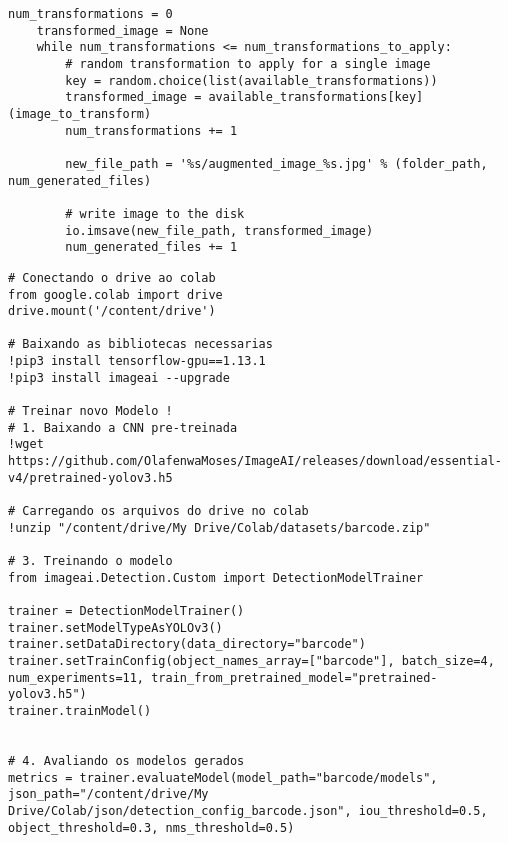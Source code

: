 \begin{lstlisting}[caption=Método de \textit{Data augmentation}]
    num_transformations = 0
    transformed_image = None
    while num_transformations <= num_transformations_to_apply:
        # random transformation to apply for a single image
        key = random.choice(list(available_transformations))
        transformed_image = available_transformations[key](image_to_transform)
        num_transformations += 1

        new_file_path = '%s/augmented_image_%s.jpg' % (folder_path, num_generated_files)

        # write image to the disk
        io.imsave(new_file_path, transformed_image)
        num_generated_files += 1
\end{lstlisting}

\newpage

\begin{lstlisting}[caption=Treinamento do modelo de \textit{barcodes}]
# Conectando o drive ao colab
from google.colab import drive
drive.mount('/content/drive')
        
# Baixando as bibliotecas necessarias
!pip3 install tensorflow-gpu==1.13.1
!pip3 install imageai --upgrade

# Treinar novo Modelo !
# 1. Baixando a CNN pre-treinada
!wget https://github.com/OlafenwaMoses/ImageAI/releases/download/essential-v4/pretrained-yolov3.h5

# Carregando os arquivos do drive no colab
!unzip "/content/drive/My Drive/Colab/datasets/barcode.zip"

# 3. Treinando o modelo
from imageai.Detection.Custom import DetectionModelTrainer

trainer = DetectionModelTrainer()
trainer.setModelTypeAsYOLOv3()
trainer.setDataDirectory(data_directory="barcode")
trainer.setTrainConfig(object_names_array=["barcode"], batch_size=4, num_experiments=11, train_from_pretrained_model="pretrained-yolov3.h5")
trainer.trainModel()


# 4. Avaliando os modelos gerados
metrics = trainer.evaluateModel(model_path="barcode/models", json_path="/content/drive/My Drive/Colab/json/detection_config_barcode.json", iou_threshold=0.5, object_threshold=0.3, nms_threshold=0.5)
\end{lstlisting}

\newpage

